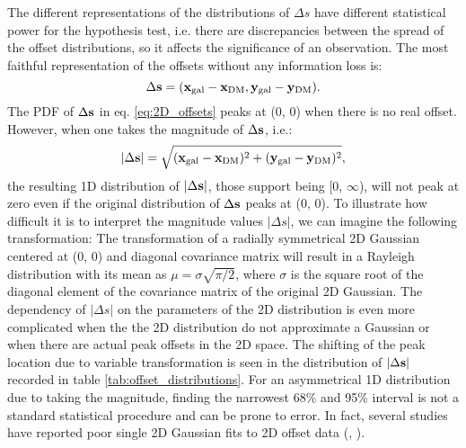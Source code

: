 The different representations of the distributions of $\Delta s$ have different 
statistical power for the hypothesis test, i.e. there are discrepancies between
the spread of the offset distributions, so
it affects the significance of an observation. 
The most faithful representation of the offsets without any information loss
is:
\begin{equation}
	\Delta {\bf s} = ({\bf x}_{\rm gal} - {\bf x}_{\rm DM}, 
	{\bf y}_{\rm gal} - {\bf y}_{\rm DM} ).
	\label{eq:2D_offsets}
\end{equation}
The PDF of $\Delta {\bf s}$ in eq. \ref{eq:2D_offsets} peaks at (0, 0) when there is no real offset.
However, when one takes the magnitude of $\Delta {\bf s}$, i.e.:
\begin{equation}
	|\Delta {\bf s}| = \sqrt{({\bf x}_{\rm gal} - {\bf x}_{\rm DM})^2 + 
	({\bf y}_{\rm gal} - {\bf y}_{\rm DM})^2},
	\label{eq:magnitude_offsets}
\end{equation}
the resulting 1D distribution of $|\Delta {\bf s}|$, 
those support being [0, $\infty$),
will not peak at zero even if the original
distribution of $\Delta {\bf s}$ peaks at (0, 0). 
To illustrate how difficult it is to interpret the magnitude values $|\Delta
s|$,  
we can imagine the following transformation:
The transformation of a radially symmetrical 
2D Gaussian centered at (0, 0) and diagonal covariance matrix will result
in a Rayleigh distribution with its mean as $\mu = \sigma \sqrt{\pi / 2}$, where
$\sigma$ is the square root of the diagonal element of the covariance matrix 
of the original 2D Gaussian. The dependency of $|\Delta s|$ on the parameters of
the 2D distribution is even more
complicated when the the 2D distribution do not approximate a Gaussian 
or when there are actual peak offsets in the 2D space. 
The shifting of the peak location due to variable transformation 
is seen in the distribution of $|\Delta {\bf s}|$ recorded in table
\ref{tab:offset_distributions}.
For an asymmetrical 1D distribution due to taking the magnitude, 
finding the narrowest 68\% and 95\% interval
is not a standard statistical procedure and can be prone to error.
In fact, several studies have reported poor single 2D Gaussian fits to 2D offset data
(\citealt{Zitrin2012a}, \citealt{Oguri2010}).  

